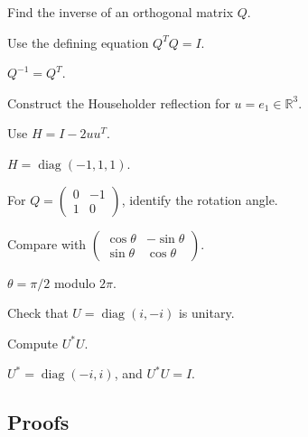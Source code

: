 \begin{exercise}[Inverse]\label{exr:i15-expand-02}
Find the inverse of an orthogonal matrix \(Q\).
\end{exercise}
\begin{hint}
Use the defining equation \(Q^TQ=I\).
\end{hint}
\begin{solution}
\(Q^{-1}=Q^T\).
\end{solution}

\begin{exercise}\label{exr:i15-expand-03}
Construct the Householder reflection for \(u=e_1\in\mathbb R^3\).
\end{exercise}
\begin{hint}
Use \(H=I-2uu^T\).
\end{hint}
\begin{solution}
\(H=\operatorname{diag}(-1,1,1)\).
\end{solution}

\begin{exercise}\label{exr:i15-expand-04}
For \(Q=\begin{pmatrix}0&-1\\1&0\end{pmatrix}\), identify the rotation angle.
\end{exercise}
\begin{hint}
Compare with \(\begin{pmatrix}\cos\theta&-\sin\theta\\\sin\theta&\cos\theta\end{pmatrix}\).
\end{hint}
\begin{solution}
\(\theta=\pi/2\) modulo \(2\pi\).
\end{solution}

\begin{exercise}\label{exr:i15-expand-05}
Check that \(U=\operatorname{diag}(i,-i)\) is unitary.
\end{exercise}
\begin{hint}
Compute \(U^*U\).
\end{hint}
\begin{solution}
\(U^*=\operatorname{diag}(-i,i)\), and \(U^*U=I\).
\end{solution}

\subsection*{Proofs}

